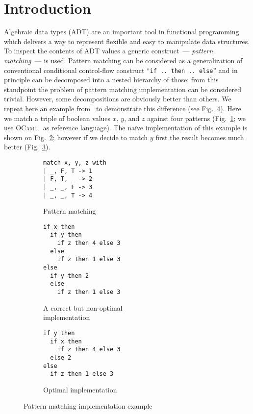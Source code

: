 \section{Introduction}
\label{sec:intro}

Algebraic data types (ADT) are an important tool in functional programming which delivers a way to represent flexible and easy to manipulate data structures.
To inspect the contents of ADT values a generic construct~--- \emph{pattern matching}~--- is used. Pattern matching can be considered as a generalization of
conventional conditional control-flow construct ``\lstinline|if .. then .. else|'' and in principle can be decomposed into a nested hierarchy of those; from
this standpoint the problem of pattern matching implementation can be considered trivial. However, some decompositions are obviously better than others. We
repeat here an example from~\cite{maranget2008} to demonstrate this difference (see Fig.~\ref{fig:match-example}). Here we match a triple of boolean
values $x$, $y$, and $z$ against four patterns (Fig.~\ref{fig:matching-example1}; we use \textsc{OCaml}~\cite{ocaml} as reference language). The na\"{i}ve
implementation of this example is shown on Fig.~\ref{fig:matching-example2}; however if we decide to match $y$ first the result becomes much
better (Fig.~\ref{fig:matching-example3}).

\begin{figure}[ht]
\begin{subfigure}[t]{0.2\linewidth}
\centering
\begin{lstlisting}
match x, y, z with
| _, F, T -> 1
| F, T, _ -> 2
| _, _, F -> 3
| _, _, T -> 4
\end{lstlisting}
\vskip18.5mm
\caption{Pattern matching}
\label{fig:matching-example1}
\end{subfigure}
\hspace{0.5cm}
\begin{subfigure}[t]{0.26\linewidth}
\centering
\begin{lstlisting}
if x then
  if y then
    if z then 4 else 3
  else
    if z then 1 else 3
else
  if y then 2
  else
    if z then 1 else 3
\end{lstlisting}
\caption{A correct but non-optimal\\\phantom{(b)~}implementation}
\label{fig:matching-example2}
\end{subfigure}
\hspace{0.5cm}
\begin{subfigure}[t]{0.33\linewidth}
\centering
\begin{lstlisting}
if y then
  if x then
    if z then 4 else 3
  else 2
else
  if z then 1 else 3
\end{lstlisting}
\vskip13.5mm
\caption{Optimal implementation}
\label{fig:matching-example3}
\end{subfigure}
\caption{Pattern matching implementation example} 
\label{fig:match-example}
\end{figure}

